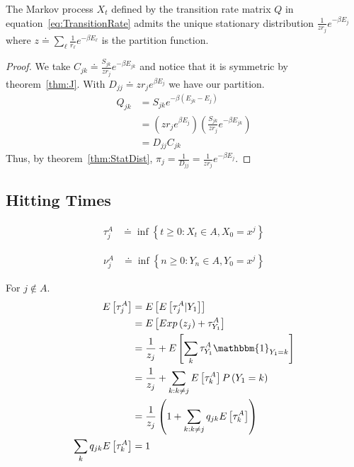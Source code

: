 \begin{mythm}
\label{thm:E}
The Markov process $X_t$ defined by the transition rate matrix $Q$ in equation~\ref{eq:TransitionRate} admits the unique stationary distribution $\frac{1}{zr_j}e^{-\beta E_j}$ where $z \doteq \sum_\ell \frac{1}{r_\ell}e^{-\beta E_\ell}$ is the partition function. 
\end{mythm}
\begin{proof}
We take $C_{jk} \doteq \frac{S_{jk}}{zr_j}e^{-\beta E_{jk}}$ and notice that it is symmetric by theorem~\ref{thm:J}. With $D_{jj} \doteq zr_je^{\beta E_j}$ we have our partition.  
\begin{align}
Q_{jk} &= S_{jk}e^{-\beta\left(E_{jk} - E_j\right)} \\
       &= \left(zr_je^{\beta E_j}\right) \left(\frac{S_{jk}}{zr_j}e^{-\beta E_{jk}}\right) \\
       &= D_{jj}C_{jk}   
\end{align}
Thus, by theorem~\ref{thm:StatDist},  $\pi_j = \frac{1}{D_{jj}} = \frac{1}{zr_j}e^{-\beta E_j}$.
\end{proof}




\subsection{Hitting Times}

\begin{align}
	\tau^{A}_{j} &\doteq \inf\left\{t \geq 0 : X_t \in A, X_0 = x^j\right\}
\end{align}

\begin{align}
	\nu^{A}_{j} &\doteq \inf\left\{n \geq 0 : Y_n \in A, Y_0 = x^j\right\}
\end{align}

For $j \not\in A$.
\begin{align}
	E\left[\tau^{A}_{j}\right] &= E\left[E\left[\tau^{A}_{j} | Y_1 \right]\right] \\
        &= E\left[ Exp\left(z_j\right) + \tau^{A}_{Y_1} \right] \\
        &=  \frac{1}{z_j} + E\left[\sum_{k}\tau^{A}_{Y_1}\mathbbm{1}_{Y_1 = k}\right] \\
        &=  \frac{1}{z_j} + \sum_{k: k\neq j}E\left[\tau^{A}_{k}\right] P\left(Y_1 = k\right) \\
        &=  \frac{1}{z_j}\left(1 + \sum_{k: k\neq j}q_{jk}E\left[\tau^{A}_{k}\right]\right)     \\
  \sum_{k}q_{jk}E\left[\tau^{A}_{k}\right] &= 1 \\
\end{align}

